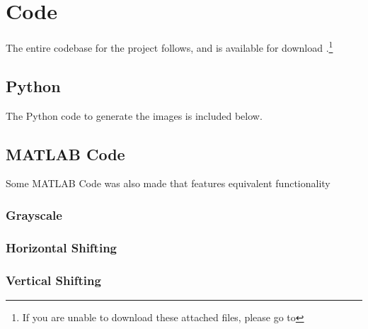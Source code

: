 \section{Code}

The entire codebase for the project follows, and is available for download .\footnote{If you are unable to download these attached files, please go to }

    \subsection{Python}

    The Python code to generate the images is included below.

        

    \newpage

    \subsection{MATLAB Code}

    Some MATLAB Code was also made that features equivalent functionality

        \subsubsection{Grayscale}

        

        \subsubsection{Horizontal Shifting}

        

        \subsubsection{Vertical Shifting}

        


